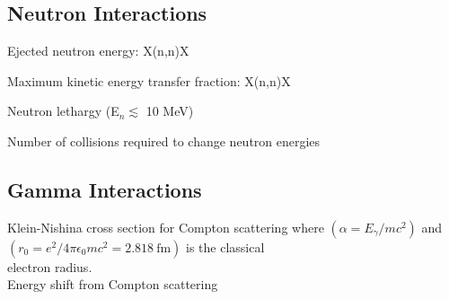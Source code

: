 \subsection{Neutron Interactions}


\noindent
Ejected neutron energy: X(n,n)X 

\noindent
Maximum kinetic energy transfer fraction: X(n,n)X 

\noindent
Neutron lethargy (E$_n \lesssim$ 10 MeV) 

\noindent
Number of collisions required to change neutron energies 

\subsection{Gamma Interactions}

\noindent
Klein-Nishina cross section for Compton scattering 
\indent where $(\alpha=E_\gamma/mc^2)$ and $(r_0=e^2/4\pi\epsilon_0mc^2=2.818~\mathrm{fm})$ is the classical \\ \indent electron radius.\\

\noindent
Energy shift from Compton scattering 

